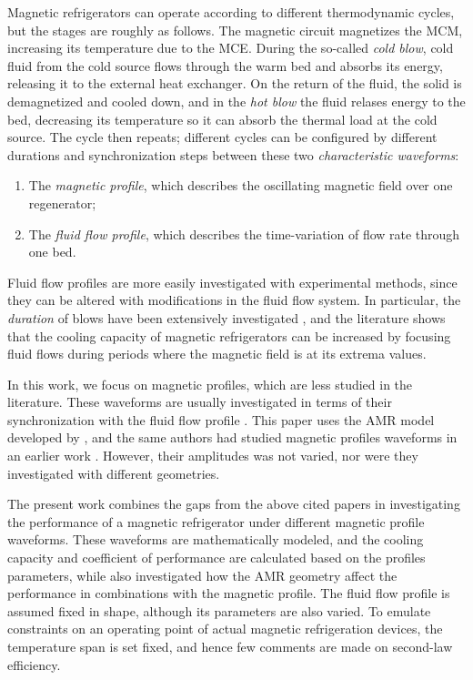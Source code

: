 \documentclass[referee]{svjour3}
\begin{document}


Magnetic refrigerators can operate according to different thermodynamic cycles, but the stages are roughly as follows. The magnetic circuit magnetizes the MCM, increasing its temperature due to the MCE. During the so-called \emph{cold blow}, cold fluid from the cold source flows through the warm bed and absorbs its energy, releasing it to the external heat exchanger. On the return of the fluid, the solid is demagnetized and cooled down, and in the \emph{hot blow} the fluid relases energy to the bed, decreasing its temperature so it can absorb the thermal load at the cold source. The cycle then repeats; different cycles can be configured by different durations and synchronization steps between these two \emph{characteristic waveforms}:

\begin{enumerate}
\item The \emph{magnetic profile}, which describes the oscillating magnetic field over one regenerator;
\item The \emph{fluid flow profile}, which describes the time-variation of flow rate through one bed.
\end{enumerate}

Fluid flow profiles are more easily investigated with experimental methods, since they can be altered with modifications in the fluid flow system. In particular, the \emph{duration} of blows have been extensively investigated \cite{bib:teyber17_exper,bib:nakashima18-influen-exp,FORTKAMP2018}, and the literature shows that the cooling capacity of magnetic refrigerators can be increased by focusing fluid flows during periods where the magnetic field is at its extrema values.

In this work, we focus on magnetic profiles, which are less studied in the literature.
These waveforms are usually investigated in terms of their synchronization with the fluid flow profile \cite{TUSEK20111507,bib:bjoerk11_amr}. This paper uses the AMR model developed by \cite{bib:trevizoli16_perfor_model}, and the same authors had studied magnetic profiles waveforms in an earlier work \cite{bib:asme-mce}. However, their amplitudes was not varied, nor were they investigated with different geometries.

The present work combines the gaps from the above cited papers in investigating the performance of a magnetic refrigerator under different magnetic profile waveforms. These waveforms are mathematically modeled, and the cooling capacity and coefficient of performance are calculated based on the profiles parameters, while also investigated how the AMR geometry affect the performance in combinations with the magnetic profile. The fluid flow profile is assumed fixed in shape, although its parameters are also varied. To emulate constraints on an operating point of actual magnetic refrigeration devices, the temperature span is set fixed, and hence few comments are made on second-law efficiency.
\end{document}
